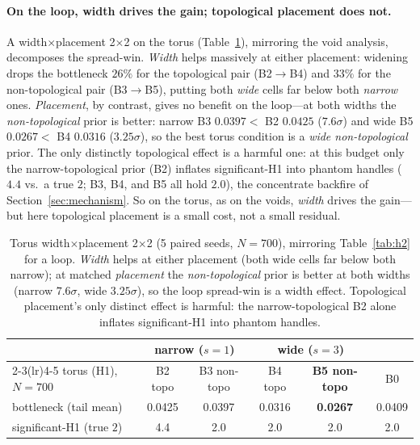 \paragraph{On the loop, width drives the gain; topological placement does not.} A
width$\times$placement 2$\times$2 on the torus (Table~\ref{tab:torus2x2}), mirroring the
void analysis, decomposes the spread-win. \emph{Width} helps massively at either
placement: widening drops the bottleneck $26\%$ for the topological pair (B2$\to$B4) and
$33\%$ for the non-topological pair (B3$\to$B5), putting both \emph{wide} cells far below
both \emph{narrow} ones. \emph{Placement}, by contrast, gives no benefit on the
loop---at both widths the \emph{non-topological} prior is better: narrow B3 $0.0397 <$ B2
$0.0425$ ($7.6\sigma$) and wide B5 $0.0267 <$ B4 $0.0316$ ($3.25\sigma$), so the best
torus condition is a \emph{wide non-topological} prior. The only distinctly topological
effect is a harmful one: at this budget only the narrow-topological prior (B2) inflates
significant-H1 into phantom handles ($4.4$ vs.\ a true $2$; B3, B4, and B5 all hold
$2.0$), the concentrate backfire of Section~\ref{sec:mechanism}. So on the torus, as on
the voids, \emph{width} drives the gain---but here topological placement is a small cost,
not a small residual.

\begin{table}[h]
\centering
\begin{tabular}{lccccc}
\toprule
 & \multicolumn{2}{c}{narrow ($s{=}1$)} & \multicolumn{2}{c}{wide ($s{=}3$)} & \\
\cmidrule(lr){2-3}\cmidrule(lr){4-5}
torus (H1), $N{=}700$ & B2 topo & B3 non-topo & B4 topo & \textbf{B5 non-topo} & B0 \\
\midrule
bottleneck (tail mean) & 0.0425 & 0.0397 & 0.0316 & \textbf{0.0267} & 0.0409 \\
significant-H1 (true $2$) & 4.4 & 2.0 & 2.0 & 2.0 & 2.0 \\
\bottomrule
\end{tabular}
\caption{Torus width$\times$placement 2$\times$2 (5 paired seeds, $N{=}700$), mirroring
Table~\ref{tab:h2} for a loop. \emph{Width} helps at either placement (both wide cells
far below both narrow); at matched \emph{placement} the \emph{non-topological} prior is
better at both widths (narrow $7.6\sigma$, wide $3.25\sigma$), so the loop spread-win is
a width effect. Topological placement's only distinct effect is harmful: the
narrow-topological B2 alone inflates significant-H1 into phantom handles.}
\label{tab:torus2x2}
\end{table}

